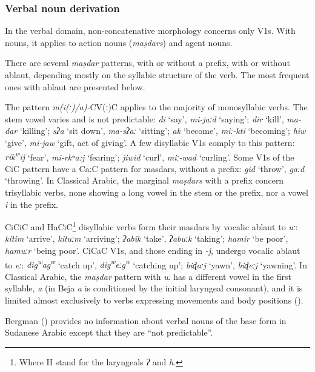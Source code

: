 \documentclass[output=paper]{langsci/langscibook}
\begin{document}
 \subsubsection{Verbal noun derivation}

In the verbal domain, non-concatenative morphology concerns only V1s. With nouns, it applies to action nouns (\textit{maṣdars}) and agent nouns.

There are several \textit{maṣdar} patterns, with or without a prefix, with or without ablaut, depending mostly on the syllabic structure of the verb. The most frequent ones with ablaut are presented below.

The pattern \textit{m(i(ː)/a)-}CV(ː)C applies to the majority of monosyllabic verbs. The stem vowel varies and is not predictable: \textit{di} ‘say’, \textit{mi-jaːd} ‘saying’; \textit{dir} ‘kill’, \textit{ma-dar} ‘killing’; \textit{sʔa} ‘sit down’, \textit{ma\nobreakdash-sʔaː} ‘sitting’; \textit{ak} ‘become’, \textit{miː-kti} ‘becoming’; \textit{hiw} ‘give’, \textit{mi-jaw} ‘gift, act of giving’. A few disyllabic V1s comply to this pattern: \textit{rik\textsuperscript{w}}\textit{ij} ‘fear’, \textit{mi-rkʷa:j} ‘fearing’; \textit{jiwid} ‘curl’, \textit{miː-wad} ‘curling’. Some V1s of the CiC pattern have a CaːC pattern for masdars, without a prefix: \textit{gid} ‘throw’, \textit{gaːd} ‘throwing’. In Classical Arabic, the marginal \textit{maṣdars} with a prefix concern trisyllabic verbs, none showing a long vowel in the stem or the prefix, nor a vowel \textit{i} in the prefix.

CiCiC and HaCiC\footnote{Where H stand for the laryngeals \textit{ʔ} and \textit{h}.} disyllabic verbs form their masdars by vocalic ablaut to \textit{uː}: \textit{kitim} ‘arrive’, \textit{kituːm} ‘arriving’; \textit{ʔabik} ‘take’, \textit{ʔabuːk} ‘taking’; \textit{hamir} ‘be poor’, \textit{hamuːr} ‘being poor’. CiCaC V1s, and those ending in \textit{{}-j}, undergo vocalic ablaut to \textit{eː}: \textit{dig\textsuperscript{w}}\textit{ag\textsuperscript{w}} ‘catch up’, \textit{dig\textsuperscript{w}}\textit{eːg\textsuperscript{w}} ‘catching up’; \textit{biɖaːj} ‘yawn’, \textit{biɖeːj} ‘yawning’. In Classical Arabic, the \textit{maṣdar} pattern with \textit{uː} has a different vowel in the first syllable, \textit{a} (in Beja \textit{a} is conditioned by the initial laryngeal consonant), and it is limited almost exclusively to verbs expressing movements and body positions (\citealt[81]{BlachèreGaudefroy-Demombynes1975}). 

Bergman (\citeyear[35]{Bergman2002}) provides no information about verbal nouns of the base form in Sudanese Arabic except that they are “not predictable”. 
\end{document}
